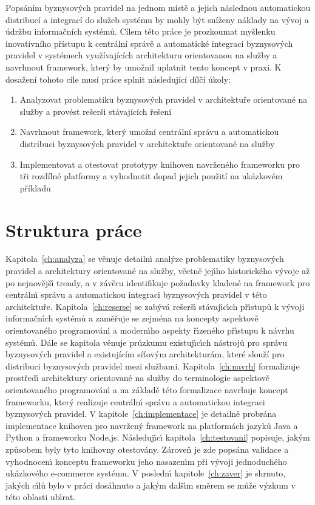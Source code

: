 Popsáním byznysových pravidel na jednom místě a jejich následnou automatickou distribucí
a integrací do služeb systému by mohly být sníženy náklady na vývoj a údržbu informačních systémů.
Cílem této práce je prozkoumat myšlenku inovativního přístupu k centrální správě
a automatické integraci byznysových pravidel v systémech využívajících architekturu orientovanou na služby
a navrhnout framework, který by umožnil uplatnit tento koncept v praxi. K dosažení tohoto cíle musí práce splnit
následující dílčí úkoly:
\begin{enumerate}
    \item Analyzovat problematiku byznysových pravidel v architektuře orientované na služby a provést rešerši stávajících řešení
    \item Navrhnout framework, který umožní centrální správu a automatickou distribuci byznysových pravidel v architektuře orientované na služby
    \item Implementovat a otestovat prototypy knihoven navrženého frameworku pro tři rozdílné platformy a vyhodnotit dopad jejich použití na ukázkovém příkladu
\end{enumerate}

\section{Struktura práce}

Kapitola~\ref{ch:analyza} se věnuje detailn\'{\i} anal\'yze problematiky byznysov\'ych pravidel a
architektury orientované na služby, včetně jej\'{\i}ho historického v\'yvoje až po nejnovějš\'{\i} trendy,
a v závěru identifikuje požadavky kladené na framework pro centráln\'{\i} správu a
automatickou integraci byznysov\'ych pravidel v této architektuře. Kapitola~\ref{ch:reserse}
se zab\'yvá rešerš\'{\i} stávaj\'{\i}c\'{\i}ch př\'{\i}stupů k v\'yvoji informačn\'{\i}ch systémů a zaměřuje se zejména
na koncepty aspektově orientovaného programován\'{\i} a modern\'{\i}ho aspekty ř\'{\i}zeného př\'{\i}stupu k návrhu
systémů. Dále se kapitola věnuje průzkumu existuj\'{\i}c\'{\i}ch nástrojů pro správu byznysov\'ych pravidel a existujícím
síťovým architekturám, které slouží pro distribuci byznysových pravidel mezi službami.
Kapitola~\ref{ch:navrh} formalizuje prostřed\'{\i} architektury orientované na služby do terminologie
aspektově orientovaného programován\'{\i} a na základě této formalizace navrhuje koncept frameworku,
kter\'y realizuje centráln\'{\i} správu a automatickou integraci byznysov\'ych pravidel.
V kapitole~\ref{ch:implementace} je detailně probrána implementace knihoven pro navržen\'y framework
na platformách jazyků Java a Python a frameworku Node.js. Následuj\'{\i}c\'{\i} kapitola~\ref{ch:testovani}
popisuje, jak\'ym způsobem byly tyto knihovny otestovány. Zároveň je zde popsána validace a
vyhodnocen\'{\i} konceptu frameworku jeho nasazen\'{\i}m při v\'yvoji
jednoduchého ukázkového e-commerce systému. V posledn\'{\i} kapitole~\ref{ch:zaver} je shrnuto, jak\'ych
c\'{\i}lů bylo v práci dosáhnuto a jak\'ym dalš\'{\i}m směrem se může v\'yzkum v této oblasti ub\'{\i}rat.

